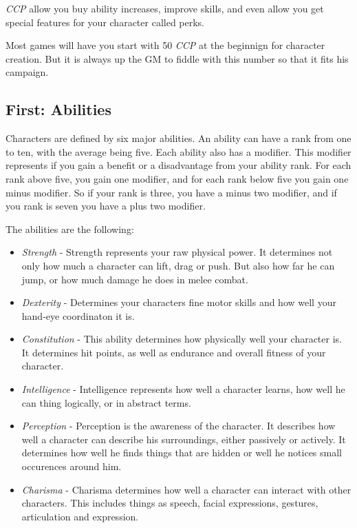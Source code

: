 \documentclass[11pt,a4paper,openany]{scrbook}
\begin{document}
\emph{CCP} allow you buy ability increases, improve skills, and even allow you
get special features for your character called perks.

Most games will have you start with 50 \emph{CCP} at the beginnign for character
creation. But it is always up the GM to fiddle with this number so that it fits
his campaign.

\subsection{First: Abilities}

Characters are defined by six major abilities. An ability can have a rank from
one to ten, with the average being five. Each ability also has a modifier. This
modifier represents if you gain a benefit or a disadvantage from your ability
rank. For each rank above five, you gain one modifier, and for each rank below
five you gain one minus modifier. So if your rank is three, you have a minus
two modifier, and if you rank is seven you have a plus two modifier.

The abilities are the following:

\begin{itemize}
\item \emph{Strength} - Strength represents your raw physical power. It
  determines not only how much a character can lift, drag or push. But also how
  far he can jump, or how much damage he does in melee combat.
\item \emph{Dexterity} - Determines your characters fine motor skills and how
  well your hand-eye coordinaton it is.
\item \emph{Constitution} - This ability determines how physically well your
  character is. It determines hit points, as well as endurance and overall
  fitness of your character.
\item \emph{Intelligence} - Intelligence represents how well a character learns,
  how well he can thing logically, or in abstract terms.
\item \emph{Perception} - Perception is the awareness of the character. It
  describes how well a character can describe his surroundings, either passively
  or actively. It determines how well he finds things that are hidden or well he
  notices small occurences around him.
\item \emph{Charisma} - Charisma determines how well a character can interact
  with other characters. This includes things as speech, facial expressions,
  gestures, articulation and expression.
\end{itemize}
\end{document}
